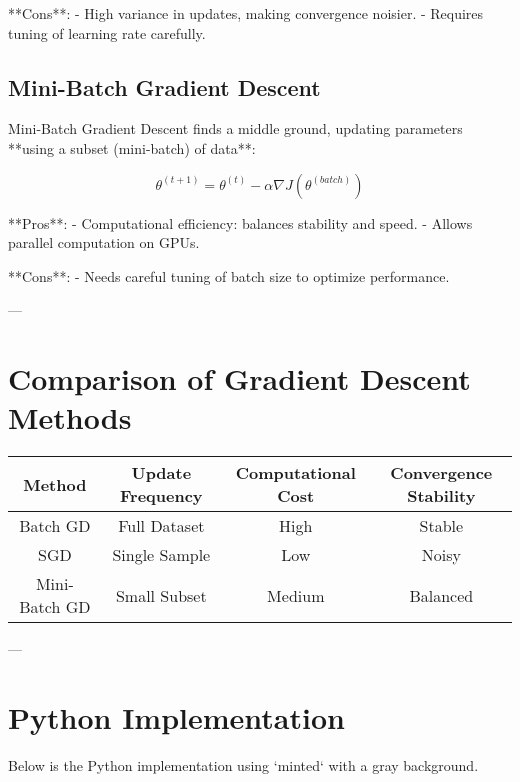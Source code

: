 **Cons**:
- High variance in updates, making convergence noisier.
- Requires tuning of learning rate carefully.

\subsection{Mini-Batch Gradient Descent}
Mini-Batch Gradient Descent finds a middle ground, updating parameters **using a subset (mini-batch) of data**:

\[
\theta^{(t+1)} = \theta^{(t)} - \alpha \nabla J(\theta^{(batch)})
\]

**Pros**:
- Computational efficiency: balances stability and speed.
- Allows parallel computation on GPUs.

**Cons**:
- Needs careful tuning of batch size to optimize performance.

---

\section{Comparison of Gradient Descent Methods}

\begin{center}
    \begin{tabular}{|c|c|c|c|}
        \hline
        Method & Update Frequency & Computational Cost & Convergence Stability \\
        \hline
        Batch GD & Full Dataset & High & Stable \\
        \hline
        SGD & Single Sample & Low & Noisy \\
        \hline
        Mini-Batch GD & Small Subset & Medium & Balanced \\
        \hline
    \end{tabular}
\end{center}

---

\section{Python Implementation}

Below is the Python implementation using `minted` with a gray background.

